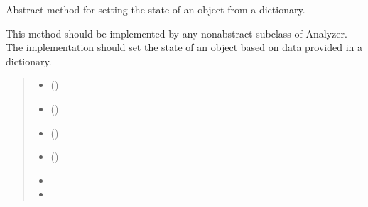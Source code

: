 \documentclass[letterpaper,10pt,english]{sphinxmanual}
\begin{document}
\begin{fulllineitems}
\begin{fulllineitems}
\label{\detokenize{forensicfit.core.analyzer:forensicfit.core.analyzer.Analyzer.from_dict}}
\pysigstartsignatures
{}
\pysigstopsignatures
\sphinxAtStartPar
Abstract method for setting the state of an object from a dictionary.

\sphinxAtStartPar
This method should be implemented by any non\sphinxhyphen{}abstract subclass of
Analyzer. The implementation should set the state of an object based
on data provided in a dictionary.
\begin{quote}\begin{description}
\begin{itemize}
\item {} 
\sphinxAtStartPar
{} () \textendash{} 

\item {} 
\sphinxAtStartPar
{} () \textendash{} 

\item {} 
\sphinxAtStartPar
{} () \textendash{} 

\item {} 
\sphinxAtStartPar
{} () \textendash{} 

\end{itemize}

\sphinxAtStartPar
\begin{itemize}
\item {} 
\sphinxAtStartPar
{}

\item {} 
\sphinxAtStartPar
{}

\end{itemize}


\end{description}\end{quote}


\end{fulllineitems}
\end{fulllineitems}
\end{document}
